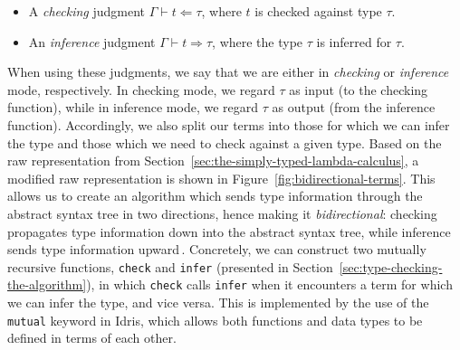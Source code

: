 \begin{itemize}
\item A \emph{checking} judgment $\Gamma \vdash t \Leftarrow \tau$, where $t$ is checked against type $\tau$.
\item An \emph{inference} judgment $\Gamma \vdash t \Rightarrow \tau$, where the type $\tau$ is inferred for $\tau$.
\end{itemize}

When using these judgments, we say that we are either in \emph{checking} or \emph{inference} mode, respectively. In checking mode, we regard $\tau$ as input (to the checking function), while in inference mode, we regard $\tau$ as output (from the inference function). Accordingly, we also split our terms into those for which we can infer the type and those which we need to check against a given type. Based on the raw representation from Section~\ref{sec:the-simply-typed-lambda-calculus}, a modified raw representation is shown in Figure~\ref{fig:bidirectional-terms}. This allows us to create an algorithm which sends type information through the abstract syntax tree in two directions, hence making it \emph{bidirectional}: checking propagates type information down into the abstract syntax tree, while inference sends type information upward\,\cite{Pfenning:bidirectional}. Concretely, we can construct two mutually recursive functions, \texttt{check} and \texttt{infer} (presented in Section~\ref{sec:type-checking-the-algorithm}), in which \texttt{check} calls \texttt{infer} when it encounters a term for which we can infer the type, and vice versa. This is implemented by the use of the \texttt{mutual} keyword in Idris, which allows both functions and data types to be defined in terms of each other.

